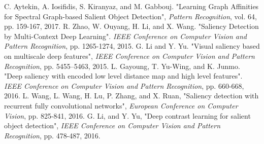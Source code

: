 \documentclass[a4paper,conference]{IEEEtran}
\begin{document}
\begin{thebibliography}{1}
C. Aytekin, A. Iosifidis, S. Kiranyaz, and M. Gabbouj. "Learning Graph Affinities for Spectral Graph-based Salient Object Detection", \emph{Pattern Recognition}, vol. 64, pp. 159-167, 2017.
R. Zhao, W. Ouyang, H. Li, and X. Wang. "Saliency Detection by Multi-Context Deep Learning". \emph{IEEE Conference on Computer Vision and Pattern Recognition}, pp. 1265-1274, 2015.
G. Li and Y. Yu. "Visual saliency based on multiscale deep features", \emph{IEEE Conference on Computer Vision and Pattern Recognition}, pp. 5455–5463, 2015.
L. Gayoung, T. Yu-Wing, and K. Junmo. "Deep saliency with encoded low level distance map and high level features". \emph{IEEE Conference on Computer Vision and Pattern Recognition}, pp. 660-668, 2016.
L. Wang, L. Wang, H. Lu, P. Zhang, and X. Ruan, "Saliency detection with recurrent fully convolutional networks", \emph{European Conference on Computer Vision}, pp. 825-841, 2016.
G. Li, and Y. Yu, "Deep contrast learning for salient object detection", \emph{IEEE Conference on Computer Vision and Pattern Recognition}, pp. 478-487, 2016.


\end{thebibliography}
\end{document}
